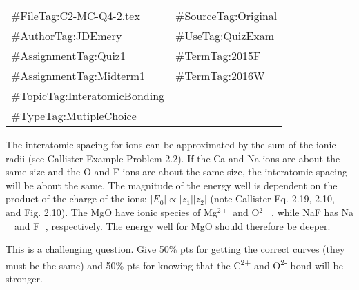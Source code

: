 \begin{FileID}
	\begin{center}
		\begin{tabular}{ll}
			\hline
			\hline
			\#FileTag:C2-MC-Q4-2.tex & 	\#SourceTag:Original\\ %
			\#AuthorTag:JDEmery & \#UseTag:QuizExam\\ %
			\hline
			\#AssignmentTag:Quiz1& \#TermTag:2015F \\ %
			\#AssignmentTag:Midterm1 & \#TermTag:2016W \\ %
			\hline
			\#TopicTag:InteratomicBonding & \\ %
			\hline
			\#TypeTag:MutipleChoice & \\
			\hline
		\end{tabular}
	\end{center}
\end{FileID}

\begin{solution}

The interatomic spacing for ions can be approximated by the sum of the ionic radii (see Callister Example Problem 2.2). If the Ca and Na ions are about the same size and the O and F ions are about the same size, the interatomic spacing will be about the same. The magnitude of the energy well is dependent on the product of the charge of the ions: $|E_{\text{0}}| \propto |z_{\text{1}}||z_{\text{2}}|$ (note Callister Eq. 2.19, 2.10, and Fig. 2.10). The MgO have ionic species of Mg$^{2+}$ and O$^{2-}$, while NaF has Na$^{+}$ and F$^{-}$, respectively. The energy well for MgO should therefore be deeper.

\end{solution}

\begin{rubric}

This is a challenging question. Give 50\% pts for getting the correct curves (they must be the same) and 50\% pts for knowing that the C\textsuperscript{2+} and O\textsuperscript{2-} bond will be stronger.

\end{rubric}

